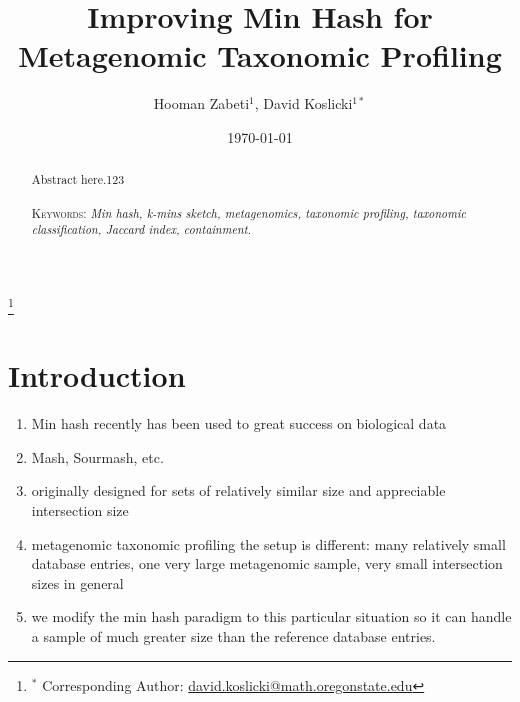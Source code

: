 \documentclass[11pt]{amsart}
\theoremstyle{remark}
\numberwithin{equation}{section}
\begin{document}
\title[Improving Min Hash]{Improving Min Hash for Metagenomic Taxonomic Profiling} %


\author{Hooman Zabeti${}^{1}$, David Koslicki${}^{1*}$}
\address{${}^1$ Mathematics Department, Oregon State University, Corvallis, OR.}
\thanks{${}^*$ Corresponding Author: \url{david.koslicki@math.oregonstate.edu}}





\date{\today}
\begin{abstract}
Abstract here.123  \\\\
\smallskip
\noindent \textsc{Keywords}: \emph{Min hash, k-mins sketch, metagenomics, taxonomic profiling, taxonomic classification, Jaccard index, containment}.
\end{abstract}
\maketitle


\section{Introduction}
\begin{enumerate}
\item Min hash recently has been used to great success on biological data
\item Mash, Sourmash, etc.
\item originally designed for sets of relatively similar size and appreciable intersection size
\item metagenomic taxonomic profiling the setup is different: many relatively small database entries, one very large metagenomic sample, very small intersection sizes in general
\item we modify the min hash paradigm to this particular situation so it can handle a sample of much greater size than the reference database entries.
\end{enumerate}
\end{document}
